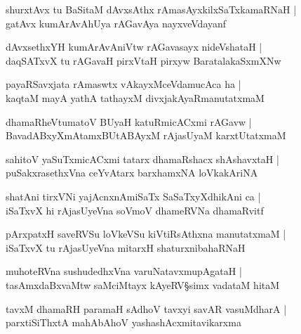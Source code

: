 \begin{shloka}
shurxtAvx tu BaSitaM dAvxsAthx rAmasAyxkilxSaTxkamaRNaH |\\
gatAvx kumArAvAhUya rAGavAya nayxveVdayanf 
\end{shloka}

\begin{shloka}
dAvxsethxYH kumArAvAniVtw rAGavasayx nideVshataH |\\
daqSATxvX tu rAGavaH pirxVtaH pirxyw BaratalakaSxmXNw
\end{shloka}

\begin{shloka}
payaRSavxjata rAmaswtx vAkayxMceVdamucAca ha |\\
kaqtaM mayA yathA tathayxM divxjakAyaRmanutatxmaM 
\end{shloka}

\begin{shloka}
dhamaRheVtumatoV BUyaH katuRmicACxmi rAGavw |\\
BavadABxyXmAtamxBUtABAyxM rAjasUyaM karxtUtatxmaM 
\end{shloka}

\begin{shloka}
sahitoV yaSuTxmicACxmi tatarx dhamaRshacx shAshavxtaH |\\
puSakxrasethxVna ceYvAtarx barxhamxNA loVkakAriNA
\end{shloka}

\begin{shloka}
shatAni tirxVNi yajAcnxnAmiSaTx SaSaTxyXdhikAni ca |\\
iSaTxvX hi rAjasUyeVna soVmoV dhameRVNa dhamaRvitf 
\end{shloka}

\begin{shloka}
pArxpatxH saveRVSu loVkeVSu kiVtiRsAthxna manutatxmaM |\\
iSaTxvX tu rAjasUyeVna mitarxH shaturxnibahaRNaH 
\end{shloka}

\begin{shloka}
muhoteRVna sushudedhxVna varuNatavxmupAgataH |\\
tasAmxdaBxvaMtw saMciMtayx kAyeRV\S simx\R{} vadataM hitaM 
\end{shloka}

\begin{shloka}
tavxM dhamaRH paramaH sAdhoV tavxyi savAR vasuMdharA |\\
parxtiSiThxtA mahAbAhoV yashashAcxmitavikarxma
\end{shloka}

